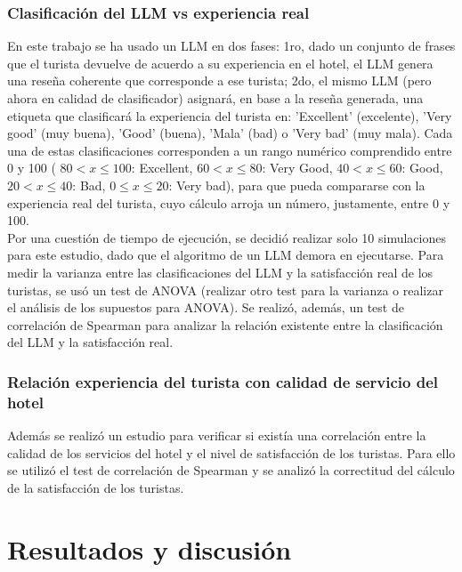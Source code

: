 \documentclass[12pt,a4paper]{article} \usepackage[spanish]{babel} \usepackage{graphicx} \usepackage{amsmath} \usepackage{amsfonts} \usepackage{amssymb} \usepackage{float} \usepackage{geometry}
\begin{document}
\subsubsection{Clasificación del LLM vs experiencia real}
En este trabajo se ha usado un LLM en dos fases: 1ro, dado un conjunto de frases que el turista devuelve de acuerdo a su experiencia en el hotel, el LLM genera una reseña coherente que corresponde a ese turista; 2do, el mismo LLM (pero ahora en calidad de clasificador) asignará, en base a la reseña generada, una etiqueta que clasificará la experiencia del turista en: 'Excellent' (excelente), 'Very good' (muy buena), 'Good' (buena), 'Mala' (bad) o 'Very bad' (muy mala). Cada una de estas clasificaciones corresponden a un rango numérico comprendido entre 0 y 100 ( $80 < x \le 100$: Excellent, $60 < x \le 80$: Very Good, $40 < x \le 60$: Good, $20 < x \le 40$: Bad, $0 \le x \le 20$: Very bad), para que pueda compararse con la experiencia real del turista, cuyo cálculo arroja un número, justamente, entre 0 y 100.\\
Por una cuestión de tiempo de ejecución, se decidió realizar solo 10 simulaciones para este estudio, dado que el algoritmo de un LLM demora en ejecutarse. Para medir la varianza entre las clasificaciones del LLM y la satisfacción real de los turistas, se usó un test de ANOVA (realizar otro test para la varianza o realizar el análisis de los supuestos para ANOVA). Se realizó, además, un test de correlación de Spearman para analizar la relación existente entre la clasificación del LLM y la satisfacción real.
\subsubsection{Relación experiencia del turista con calidad de servicio del hotel}
Además se realizó un estudio para verificar si existía una correlación entre la calidad de los servicios del hotel y el nivel de satisfacción de los turistas. Para ello se utilizó el test de correlación de Spearman y se analizó la correctitud del cálculo de la satisfacción de los turistas.


\section{Resultados y discusión}

\end{document}
